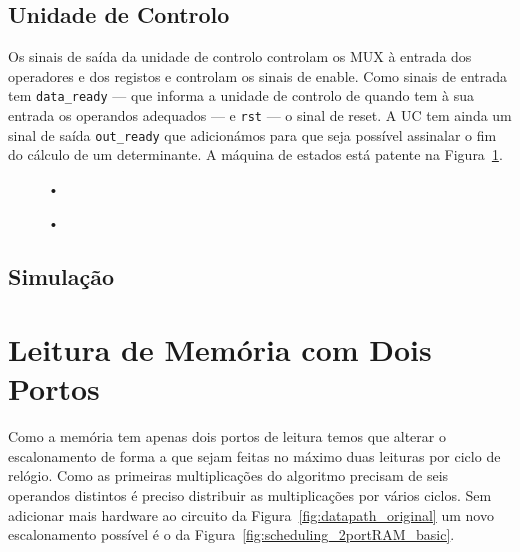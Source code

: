 \documentclass[a4paper]{article}
\begin{document}
\subsection{Unidade de Controlo}

Os sinais de saída da unidade de controlo controlam os MUX à entrada dos operadores e dos registos e controlam os sinais de enable. Como sinais de entrada tem \texttt{data\_ready} --- que informa a unidade de controlo de quando tem à sua entrada os operandos adequados --- e \texttt{rst} --- o sinal de reset. A UC tem ainda um sinal de saída \texttt{out\_ready} que adicionámos para que seja possível assinalar o fim do cálculo de um determinante. A máquina de estados está patente na Figura~\ref{fig:statemachine}.

\begin{figure}[h]
	\centering
	•
	\caption{•}
	\label{fig:statemachine}
\end{figure}

\subsection{Simulação}

\section{Leitura de Memória com Dois Portos}
\label{sec:leitura_mem_2portos}

Como a memória tem apenas dois portos de leitura temos que alterar o escalonamento de forma a que sejam feitas no máximo duas leituras por ciclo de relógio. Como as primeiras multiplicações do algoritmo precisam de seis operandos distintos é preciso distribuir as multiplicações por vários ciclos. Sem adicionar mais hardware ao circuito da Figura~\ref{fig:datapath_original} um novo escalonamento possível é o da Figura~\ref{fig:scheduling_2portRAM_basic}.
\end{document}

